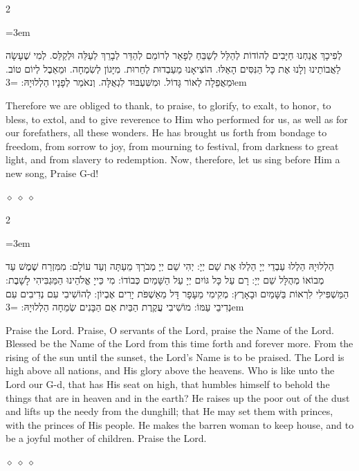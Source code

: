 \documentclass[11pt, openany]{book}
\newenvironment{bilingual}{%
  \par\vspace{4pt}%
  \begin{paracol}{2}%
}{%
  \end{paracol}%
  \par\vspace{2pt}%
}
\newenvironment{hebrewcol}{%
  \switchcolumn[1]%
  \begingroup
  \RTL
  \hebrewfont\large
  \setstretch{1.4}%
  \emergencystretch=3em
  \tolerance=9999
  \parindent=0pt\relax
}{%
  \endRTL
  \endgroup
}
\newenvironment{englishcol}{%
  \switchcolumn[0]%
  \begingroup
  \setstretch{1.4}%
  \emergencystretch=3em
  \tolerance=9999
  \normalsize
  \rightskip=0.12in\relax
}{%
  \endgroup
}
\newcommand{\parasep}{%
  \par\vspace{3pt}
  \begin{center}
    \textcolor{sedergold!50}{\tiny$\diamond\;\diamond\;\diamond$}
  \end{center}
  \par\vspace{3pt}
}
\begin{document}
\begin{bilingual}
\begin{hebrewcol}
לְפִיכָךְ אֲנַחְנוּ חַיָּבִים לְהוֹדוֹת לְהַלֵּל לְשַׁבֵּחַ לְפָאֵר לְרוֹמֵם לְהַדֵּר לְבָרֵךְ לְעַלֵּה וּלְקַלֵּס. לְמִי שֶׁעָשָׂה לַאֲבוֹתֵינוּ וְלָנוּ אֶת כָּל הַנִּסִּים הָאֵלּוּ. הוֹצִיאָנוּ מֵעַבְדוּת לְחֵרוּת. מִיָּגוֹן לְשִׂמְחָה.
וּמֵאֵבֶל לְיוֹם טוֹב. וּמֵאֲפֵלָה לְאוֹר גָּדוֹל. וּמִשִּׁעְבּוּד לִגְאֻלָּה. וְנאֹמַר לְפָנָיו הַלְלוּיָהּ:
\end{hebrewcol}
\begin{englishcol}
Therefore we are obliged to thank, to praise, to glorify, to exalt, to honor, to bless, to extol, and to give reverence to Him who performed for us, as well as for our forefathers, all these wonders. He has brought us forth from bondage to freedom, from sorrow to joy, from mourning to festival, from darkness to great light, and from slavery to redemption. Now, therefore, let us sing before Him a new song, Praise G-d!
\end{englishcol}
\end{bilingual}
\parasep

\begin{bilingual}
\begin{hebrewcol}
הַלְלוּיָהּ הַלְלוּ עַבְדֵי יְיָ הַלְלוּ אֶת שֵׁם יְיָ: יְהִי שֵׁם יְיָ מְבֹרָךְ מֵעַתָּה וְעַד עוֹלָם: מִמִּזְרַח שֶׁמֶשׁ עַד מְבוֹאוֹ מְהֻלָּל שֵׁם יְיָ: רָם עַל כָּל גּוֹיִם יְיָ עַל הַשָּׁמַיִם כְּבוֹדוֹ: מִי כַּייָ אֱלֹהֵינוּ הַמַּגְבִּיהִי לָשָׁבֶת: הַמַּשְׁפִּילִי לִרְאוֹת בַּשָּׁמַיִם וּבָאָרֶץ: מְקִימִי מֵעָפָר דָּל מֵאַשְׁפֹּת יָרִים אֶבְיוֹן: לְהוֹשִׁיבִי עִם נְדִיבִים עִם נְדִיבֵי עַמּוֹ: מוֹשִׁיבִי עֲקֶרֶת הַבַּיִת אֵם הַבָּנִים שְׂמֵחָה הַלְלוּיָהּ:
\end{hebrewcol}
\begin{englishcol}
Praise the Lord. Praise, O servants of the Lord, praise the Name of the Lord. Blessed be the Name of the Lord from this time forth and forever more. From the rising of the sun until the sunset, the Lord's Name is to be praised. The Lord is high above all nations, and His glory above the heavens. Who is like unto the Lord our G-d, that has His seat on high, that humbles himself to behold the things that are in heaven and in the earth? He raises up the poor out of the dust and lifts up the needy from the dunghill; that He may set them with princes, with the princes of His people. He makes the barren woman to keep house, and to be a joyful mother of children. Praise the Lord.
\end{englishcol}
\end{bilingual}
\parasep
\end{document}
